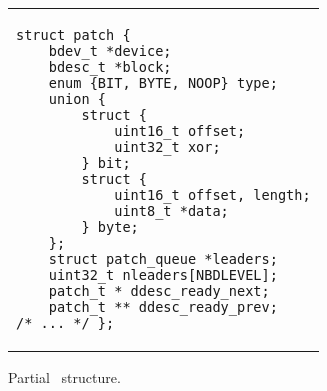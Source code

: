 \section {\ChDescs}
\label{sec:chdescs}

\newcommand{\ChAll}{\ensuremath{\textit{All}}}
\newcommand{\ChAllB}[1]{\ensuremath{\textit{All}[#1]}}
\newcommand{\ChMem}{\ensuremath{\textit{Mem}}}
\newcommand{\ChMemB}[1]{\ensuremath{\textit{Mem}[#1]}}
\newcommand{\ChDisk}{\ensuremath{\textit{Disk}}}
\newcommand{\ChDiskB}[1]{\ensuremath{\textit{Disk}[#1]}}
\newcommand{\ChInf}{\ensuremath{\textit{Inf}}}
\newcommand{\ChInfB}[1]{\ensuremath{\textit{Inf\/}[#1]}}
\newcommand{\ChNrb}{\ensuremath{\textit{\Nrb}}}
\newcommand{\ChNrbB}[1]{\ensuremath{\textit{\Nrb}[#1]}}

\newcommand{\Before}[1]{\ensuremath{\textit{Pre}[#1]}}
\newcommand{\BeforeS}[1]{\ensuremath{\textit{Pre}^*[#1]}}
\newcommand{\After}[1]{\ensuremath{\textit{Post}[#1]}}
\newcommand{\AfterS}[1]{\ensuremath{\textit{Post}^*[#1]}}

\newcommand{\statenone}{\ensuremath{\textit{cached}}}
\newcommand{\stateinf}{\ensuremath{\textit{inflight}}}
\newcommand{\statedisk}{\ensuremath{\textit{ondisk}}}

\begin{figure}[t]
\vskip-14pt
\begin{tabular}{@{\hskip0.58in}p{2in}@{}}
\begin{scriptsize}
\begin{verbatim}
struct patch {
    bdev_t *device;
    bdesc_t *block;
    enum {BIT, BYTE, NOOP} type;
    union {
        struct {
            uint16_t offset;
            uint32_t xor;
        } bit;
        struct {
            uint16_t offset, length;
            uint8_t *data;
        } byte;
    };
    struct patch_queue *leaders;
    uint32_t nleaders[NBDLEVEL];
    patch_t * ddesc_ready_next;
    patch_t ** ddesc_ready_prev;
/* ... */ };
\end{verbatim}
\end{scriptsize}
\end{tabular}
\vspace{-10pt}
\caption{\label{fig:chdesc} Partial \chdesc\ structure.}
\end{figure}

